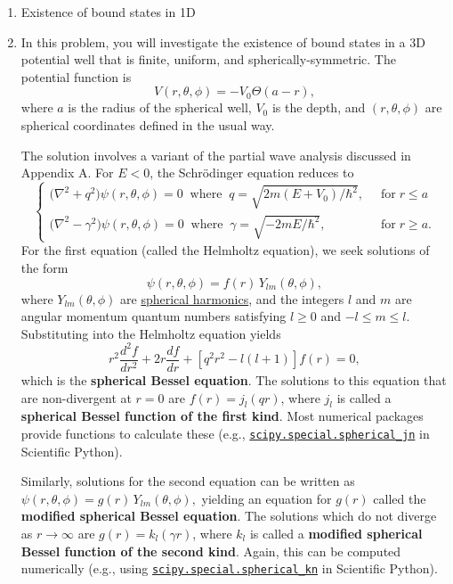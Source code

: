 \documentclass[pra,12pt]{revtex4}
\begin{document}
\begin{enumerate}
\item Existence of bound states in 1D
\label{ex:boundstate}

\item In this problem, you will investigate the existence of bound
  states in a 3D potential well that is finite, uniform, and
  spherically-symmetric.  The potential function is
$$V(r,\theta,\phi) = -V_0\Theta(a-r),$$
  where $a$ is the radius of the spherical well, $V_0$ is the depth,
  and $(r,\theta,\phi)$ are spherical coordinates defined in the usual
  way.

  The solution involves a variant of the partial wave analysis
  discussed in Appendix A.  For $E < 0$, the Schr\"odinger equation
  reduces to
$$\begin{cases}\Big(\nabla^2 + q^2\Big) \psi(r,\theta,\phi) = 0 \;\;\mathrm{where}\;\; q = \sqrt{2m(E+V_0)/\hbar^2}, \;\;&\mathrm{for} \; r \le a \\ \Big(\nabla^2 - \gamma^2\Big) \psi(r,\theta,\phi) = 0 \;\;\mathrm{where}\;\; \gamma = \sqrt{-2mE/\hbar^2}, \;\;&\mathrm{for} \; r \ge a. \end{cases}$$
  For the first equation (called the Helmholtz equation), we seek
  solutions of the form
  $$\psi(r,\theta,\phi) = f(r) \, Y_{lm}(\theta,\phi),$$
  where $Y_{lm}(\theta,\phi)$ are
  \href{https://en.wikipedia.org/wiki/Spherical_harmonics}{spherical
    harmonics}, and the integers $l$ and $m$ are angular momentum
  quantum numbers satisfying $l \ge 0$ and $-l \le m \le l$.
  Substituting into the Helmholtz equation yields
  $$r^2\frac{d^2f}{dr^2} + 2r \frac{df}{dr}+\left[q^2r^2-l(l+1)\right] f(r) = 0,$$
  which is the \textbf{spherical Bessel equation}.  The solutions to
  this equation that are non-divergent at $r = 0$ are $f(r) =
  j_l(qr)$, where $j_l$ is called a \textbf{spherical Bessel function
    of the first kind}.  Most numerical packages provide functions to
  calculate these (e.g.,
  \href{https://docs.scipy.org/doc/scipy/reference/generated/scipy.special.spherical_jn.html}{\texttt{scipy.special.spherical\_jn}}
  in Scientific Python).

  Similarly, solutions for the second equation can be written as
  $\psi(r,\theta,\phi) = g(r) \, Y_{lm}(\theta,\phi),$ yielding an
  equation for $g(r)$ called the \textbf{modified spherical Bessel
    equation}.  The solutions which do not diverge as $r\rightarrow
  \infty$ are $g(r) = k_l(\gamma r)$, where $k_l$ is called a
  \textbf{modified spherical Bessel function of the second kind}.
  Again, this can be computed numerically (e.g., using
  \href{https://docs.scipy.org/doc/scipy/reference/generated/scipy.special.spherical_kn.html#scipy.special.spherical_kn}{\texttt{scipy.special.spherical\_kn}}
  in Scientific Python).


\end{enumerate}
\end{document}

